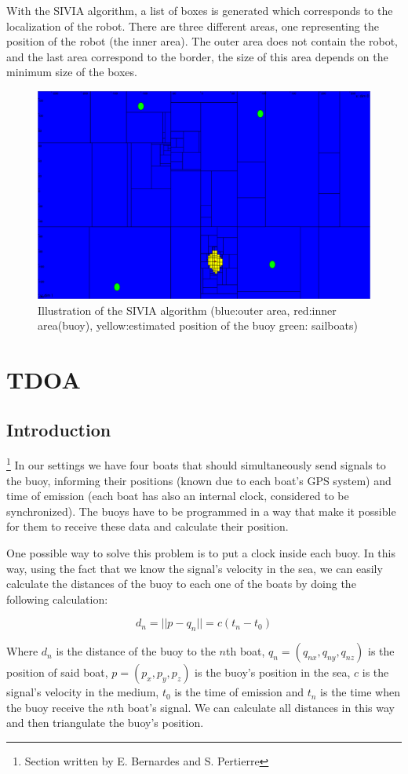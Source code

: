 \documentclass[a4paper]{report}
\begin{document}
With the SIVIA algorithm, a list of boxes is generated which corresponds to the localization of the robot. There are three different areas, one representing the position of the robot (the inner area). The outer area does not contain the robot, and the last area correspond to the border, the size of this area depends on the minimum size of the boxes.
\begin{figure}[H]
	\centering
    \includegraphics[width=0.4\linewidth]{image/loca_IA.png}
    \begin{center}\caption{ Illustration of the SIVIA algorithm (blue:outer area, red:inner area(buoy), yellow:estimated position of the buoy green: sailboats)}\end{center}
    \label{fig:SIVIA picture}
\end{figure}

\section{TDOA}
\subsection{Introduction}
\footnote{Section written by E. Bernardes and S. Pertierre} 
In our settings we have four boats that should simultaneously send signals to the buoy, informing their positions (known due to each boat's GPS system) and time of emission (each boat has also an internal clock, considered to be synchronized). 
%
The buoys have to be programmed in a way that make it possible for them to receive these data and calculate their position. 

One possible way to solve this problem is to put a clock inside each buoy.
%
In this way, using the fact that we know the signal's velocity in the sea, we can easily calculate the distances of the buoy to each one of the boats by doing the following calculation:

\begin{equation}
	d_n = ||p - q_n|| = c(t_n - t_0)
	\label{eq:distance}
\end{equation}

Where $d_n$ is the distance of the buoy to the $n$th boat, $q_n = (q_{nx},q_{ny},q_{nz})$ is the position of said boat, $p = (p_x,p_y,p_z)$ is the buoy's position in the sea, $c$ is the signal's velocity in the medium, $t_0$ is the time of emission and $t_n$ is the time when the buoy receive the $n$th boat's signal. 
%
We can calculate all distances in this way and then triangulate the buoy's position.
\end{document}
